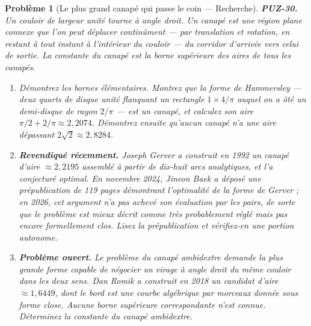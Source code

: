 \documentclass[11pt]{article}
\newtheorem{problem}{Problème}
\begin{document}
\bigskip

\begin{problem}[{Le plus grand canapé qui passe le coin --- Recherche}]
\textbf{PUZ-30.} Un couloir de largeur unité tourne à angle droit. Un \textit{canapé} est une région plane connexe que l'on peut déplacer continûment --- par translation et rotation, en restant à tout instant à l'intérieur du couloir --- du corridor d'arrivée vers celui de sortie. La \textit{constante du canapé} est la borne supérieure des aires de tous les canapés.
\begin{enumerate}
\item[(a)] Démontrez les bornes élémentaires. Montrez que la forme de Hammersley --- deux quarts de disque unité flanquant un rectangle $ 1 \times 4/\pi $ auquel on a ôté un demi-disque de rayon $ 2/\pi $ --- est un canapé, et calculez son aire $ \pi/2 + 2/\pi \approx 2{,}2074 $. Démontrez ensuite qu'aucun canapé n'a une aire dépassant $ 2\sqrt{2} \approx 2{,}8284 $.
\item[(b)] \textbf{Revendiqué récemment.} Joseph Gerver a construit en 1992 un canapé d'aire $ \approx 2{,}2195 $ assemblé à partir de dix-huit arcs analytiques, et l'a conjecturé optimal. En novembre 2024, Jineon Baek a déposé une prépublication de 119 pages démontrant l'optimalité de la forme de Gerver ; en 2026, cet argument n'a pas achevé son évaluation par les pairs, de sorte que le problème est mieux décrit comme très probablement réglé mais pas encore formellement clos. Lisez la prépublication et vérifiez-en une portion autonome.
\item[(c)] \textbf{Problème ouvert.} Le problème du canapé \textit{ambidextre} demande la plus grande forme capable de négocier un virage à angle droit du même couloir dans les deux sens. Dan Romik a construit en 2018 un candidat d'aire $ \approx 1{,}6449 $, dont le bord est une courbe algébrique par morceaux donnée sous forme close. Aucune borne supérieure correspondante n'est connue. Déterminez la constante du canapé ambidextre.
\end{enumerate}

\end{problem}
\end{document}

